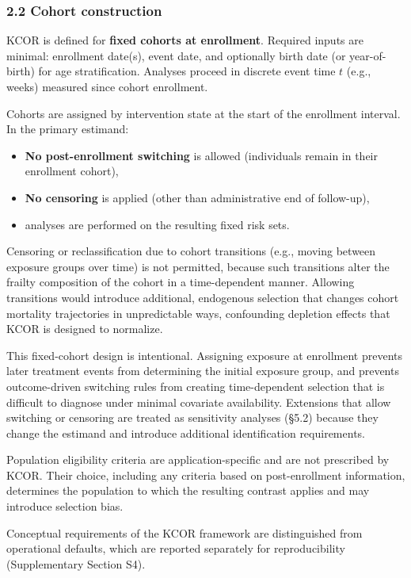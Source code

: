 \documentclass[
]{article}
\providecommand{\tightlist}{%
  \setlength{\itemsep}{0pt}\setlength{\parskip}{0pt}}
\begin{document}
\subsubsection{2.2 Cohort construction}\label{cohort-construction}

KCOR is defined for \textbf{fixed cohorts at enrollment}. Required inputs are minimal: enrollment date(s), event date, and optionally birth date (or year-of-birth) for age stratification. Analyses proceed in discrete event time \(t\) (e.g., weeks) measured since cohort enrollment.

Cohorts are assigned by intervention state at the start of the enrollment interval. In the primary estimand:

\begin{itemize}
\tightlist
\item
  \textbf{No post-enrollment switching} is allowed (individuals remain in their enrollment cohort),
\item
  \textbf{No censoring} is applied (other than administrative end of follow-up),
\item
  analyses are performed on the resulting fixed risk sets.
\end{itemize}

Censoring or reclassification due to cohort transitions (e.g., moving between exposure groups over time) is not permitted, because such transitions alter the frailty composition of the cohort in a time-dependent manner. Allowing transitions would introduce additional, endogenous selection that changes cohort mortality trajectories in unpredictable ways, confounding depletion effects that KCOR is designed to normalize.

This fixed-cohort design is intentional. Assigning exposure at enrollment prevents later treatment events from determining the initial exposure group, and prevents outcome-driven switching rules from creating time-dependent selection that is difficult to diagnose under minimal covariate availability. Extensions that allow switching or censoring are treated as sensitivity analyses (§5.2) because they change the estimand and introduce additional identification requirements.

Population eligibility criteria are application-specific and are not prescribed by KCOR. Their choice, including any criteria based on post-enrollment information, determines the population to which the resulting contrast applies and may introduce selection bias.

Conceptual requirements of the KCOR framework are distinguished from operational defaults, which are reported separately for reproducibility (Supplementary Section S4).
\end{document}

